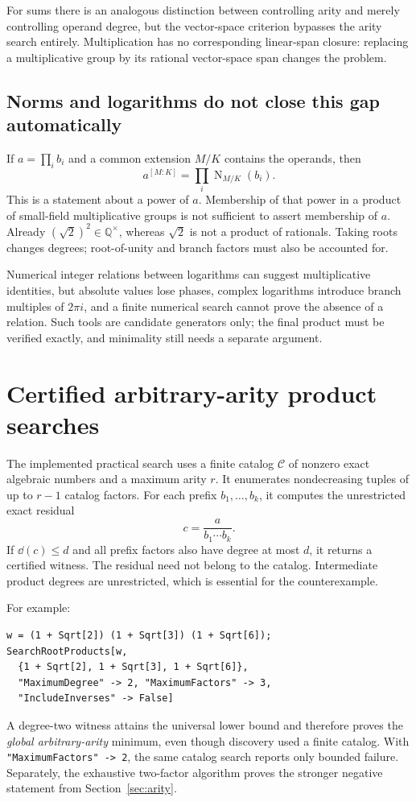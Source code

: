 \documentclass[11pt,a4paper]{article}
\theoremstyle{definition}\newtheorem{definition}[theorem]{Definition}
\theoremstyle{remark}\newtheorem{remark}[theorem]{Remark}
\newcommand{\Q}{\mathbb Q}\newcommand{\C}{\mathbb C}\newcommand{\Z}{\mathbb Z}
\newcommand{\Nm}{\operatorname{N}}\newcommand{\Res}{\operatorname{Res}}
\newcommand{\wl}[1]{\texttt{#1}}
\begin{document}
For sums there is an analogous distinction between controlling arity and merely controlling operand degree, but the vector-space criterion bypasses the arity search entirely. Multiplication has no corresponding linear-span closure: replacing a multiplicative group by its rational vector-space span changes the problem.

\subsection{Norms and logarithms do not close this gap automatically}
If $a=\prod_i b_i$ and a common extension $M/K$ contains the operands, then
\[
 a^{[M:K]}=\prod_i\Nm_{M/K}(b_i).
\]
This is a statement about a power of $a$. Membership of that power in a product of small-field multiplicative groups is not sufficient to assert membership of $a$. Already $(\sqrt2)^2\in\Q^\times$, whereas $\sqrt2$ is not a product of rationals. Taking roots changes degrees; root-of-unity and branch factors must also be accounted for.

Numerical integer relations between logarithms can suggest multiplicative identities, but absolute values lose phases, complex logarithms introduce branch multiples of $2\pi i$, and a finite numerical search cannot prove the absence of a relation. Such tools are candidate generators only; the final product must be verified exactly, and minimality still needs a separate argument.

\section{Certified arbitrary-arity product searches}
\label{sec:catalog}
The implemented practical search uses a finite catalog $\mathcal C$ of nonzero exact algebraic numbers and a maximum arity $r$. It enumerates nondecreasing tuples of up to $r-1$ catalog factors. For each prefix $b_1,\ldots,b_k$, it computes the unrestricted exact residual
\[
 c=\frac{a}{b_1\cdots b_k}.
\]
If $\dd(c)\le d$ and all prefix factors also have degree at most $d$, it returns a certified witness. The residual need not belong to the catalog. Intermediate product degrees are unrestricted, which is essential for the counterexample.

For example:
\begin{lstlisting}
w = (1 + Sqrt[2]) (1 + Sqrt[3]) (1 + Sqrt[6]);
SearchRootProducts[w,
  {1 + Sqrt[2], 1 + Sqrt[3], 1 + Sqrt[6]},
  "MaximumDegree" -> 2, "MaximumFactors" -> 3,
  "IncludeInverses" -> False]
\end{lstlisting}
A degree-two witness attains the universal lower bound and therefore proves the \emph{global arbitrary-arity} minimum, even though discovery used a finite catalog. With \wl{"MaximumFactors" -> 2}, the same catalog search reports only bounded failure. Separately, the exhaustive two-factor algorithm proves the stronger negative statement from Section~\ref{sec:arity}.
\end{document}
